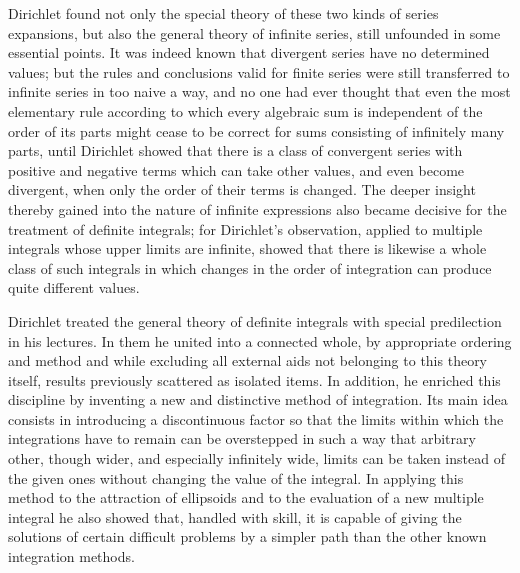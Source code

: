 \documentclass[11pt]{article}
\begin{document}
Dirichlet found not only the special theory of these two kinds of series expansions, but also the general theory of infinite series, still unfounded in some essential points. It was indeed known that divergent series have no determined values; but the rules and conclusions valid for finite series were still transferred to infinite series in too naive a way, and no one had ever thought that even the most elementary rule according to which every algebraic sum is independent of the order of its parts might cease to be correct for sums consisting of infinitely many parts, until Dirichlet showed that there is a class of convergent series with positive and negative terms which can take other values, and even become divergent, when only the order of their terms is changed. The deeper insight thereby gained into the nature of infinite expressions also became decisive for the treatment of definite integrals; for Dirichlet's observation, applied to multiple integrals whose upper limits are infinite, showed that there is likewise a whole class of such integrals in which changes in the order of integration can produce quite different values.

Dirichlet treated the general theory of definite integrals with special predilection in his lectures. In them he united into a connected whole, by appropriate ordering and method and while excluding all external aids not belonging to this theory itself, results previously scattered as isolated items. In addition, he enriched this discipline by inventing a new and distinctive method of integration. Its main idea consists in introducing a discontinuous factor so that the limits within which the integrations have to remain can be overstepped in such a way that arbitrary other, though wider, and especially infinitely wide, limits can be taken instead of the given ones without changing the value of the integral. In applying this method to the attraction of ellipsoids and to the evaluation of a new multiple integral he also showed that, handled with skill, it is capable of giving the solutions of certain difficult problems by a simpler path than the other known integration methods.
\end{document}
